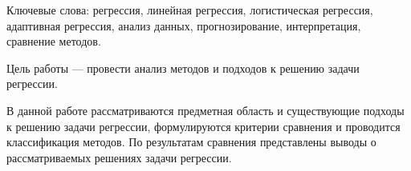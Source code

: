 \begin{essay}{}
    Ключевые слова: регрессия, линейная регрессия, логистическая регрессия, адаптивная регрессия, анализ данных, прогнозирование, интерпретация, сравнение методов.

    Цель работы --- провести анализ методов и подходов к решению задачи регрессии.

    В данной работе рассматриваются предметная область и существующие подходы к решению задачи регрессии, формулируются критерии сравнения и проводится классификация методов.
    По результатам сравнения представлены выводы о рассматриваемых решениях задачи регрессии.
\end{essay}